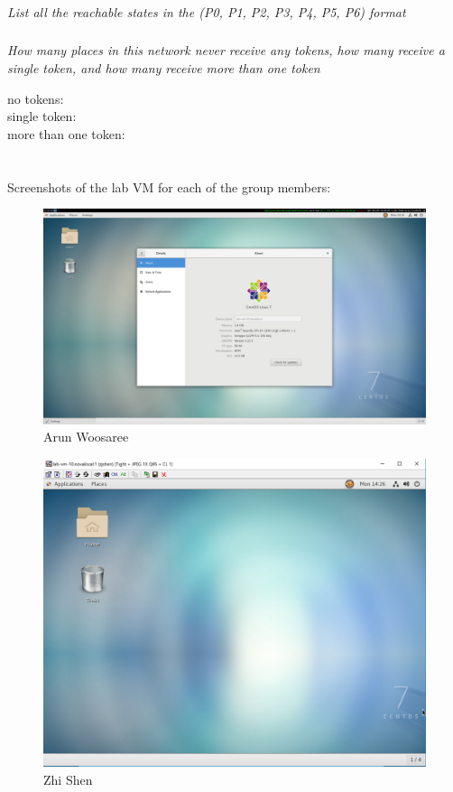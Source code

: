 \documentclass[letterpaper]{article}
\begin{document}
\subsubsection{}
\textit{List all the reachable states in the (P0, P1, P2, P3, P4, P5, P6) format}

\subsubsection{}
\textit{How many places in this network never receive any tokens, how many receive a single token, and how many receive more than one token}

no tokens: \\
single token: \\
more than one token: \\


\section{}

Screenshots of the lab VM for each of the group members:

\begin{figure}[H]
 \centering
 \includegraphics[width=\textwidth]{arun.png}
 \caption{Arun Woosaree}
\end{figure}

\begin{figure}[H]
 \centering
 \includegraphics[width=\textwidth]{max.png}
 \caption{Zhi Shen}
\end{figure}
\end{document}

